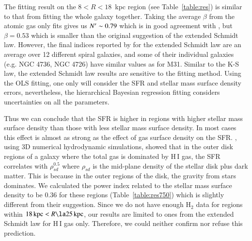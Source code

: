 The fitting result on the $8<R<18$~kpc region (see Table~\ref{table:res}) is similar to that from fitting the whole galaxy together.  Taking the average $\beta$ from the atomic gas only fits gives us $N^\prime \sim 0.79$ which is in good agreement with \citet{Shi11}, but $\beta = 0.53$  which is smaller than the original suggestion of the extended Schmidt law. However, the final indices reported by \citet{Shi11} for  the extended Schmidt law are an average over 12 different spiral galaxies, and some of their individual galaxies (e.g. NGC 4736, NGC 4726) have similar values as for M31.
Similar to the K-S law, the extended Schmidt law results are sensitive to the fitting method. Using the OLS fitting, one only will consider the SFR and stellar mass surface density errors, nevertheless, the hierarchical Bayesian regression fitting considers uncertainties on all the parameters.
 

Thus we can conclude that the SFR is higher in regions with higher stellar mass surface density than those with less stellar mass surface density.
In most cases this effect is almost as strong as the effect of gas surface density on the SFR.
\citet{Kim13}, using 3D numerical hydrodynamic simulations, showed that in the outer disk regions of a galaxy where the total gas is dominated by H\,{\sc I} gas, the SFR correlates with $\rho_{sd}^{0.5}$ where $\rho_{sd}$ is the mid-plane density of the stellar disk plus dark matter. This is because in the outer regions of the disk, the gravity from stars dominates. 
We calculated the power index related to the stellar mass surface density to be 0.36 for these regions (Table~\ref{table:res750}) which is slightly different from their suggestion. Since we do not have enough H$_2$ data for regions within $18\kpc < R \la 25\kpc$, our results are limited to ones from the extended Schmidt law for H\,{\sc I} gas only. Therefore, we could neither confirm nor refuse this prediction.

